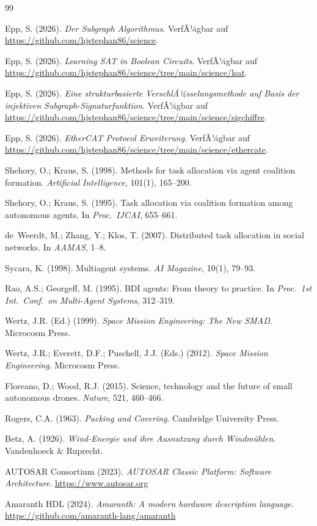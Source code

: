 ﻿\documentclass[a4paper,12pt]{article}
\theoremstyle{definition}
\begin{document}
\begin{thebibliography}{99}

Epp, S. (2026).
\textit{Der Subgraph Algorithmus}. VerfÃ¼gbar auf
\url{https://github.com/hjstephan86/science}.

Epp, S. (2026).
\textit{Learning SAT in Boolean Circuits}. VerfÃ¼gbar auf
\url{https://github.com/hjstephan86/science/tree/main/science/lsat}.

Epp, S. (2026).
\textit{Eine strukturbasierte VerschlÃ¼sselungsmethode auf Basis der injektiven Subgraph-Signaturfunktion}. VerfÃ¼gbar auf
\url{https://github.com/hjstephan86/science/tree/main/science/sigchiffre}.

Epp, S. (2026).
\textit{EtherCAT Protocol Erweiterung}.  VerfÃ¼gbar auf
\url{https://github.com/hjstephan86/science/tree/main/science/ethercate}.

Shehory, O.; Kraus, S. (1998).
Methods for task allocation via agent coalition formation.
\textit{Artificial Intelligence}, 101(1), 165--200.

Shehory, O.; Kraus, S. (1995).
Task allocation via coalition formation among autonomous agents.
In \textit{Proc.\ IJCAI}, 655--661.

de~Weerdt, M.; Zhang, Y.; Klos, T. (2007).
Distributed task allocation in social networks.
In \textit{AAMAS}, 1--8.

Sycara, K. (1998).
Multiagent systems.
\textit{AI Magazine}, 10(1), 79--93.

Rao, A.S.; Georgeff, M. (1995).
BDI agents: From theory to practice.
In \textit{Proc.\ 1st Int.\ Conf.\ on Multi-Agent Systems}, 312--319.

Wertz, J.R. (Ed.) (1999).
\textit{Space Mission Engineering: The New SMAD}.
Microcosm Press.

Wertz, J.R.; Everett, D.F.; Puschell, J.J. (Eds.) (2012).
\textit{Space Mission Engineering}. Microcosm Press.

Floreano, D.; Wood, R.J. (2015).
Science, technology and the future of small autonomous drones.
\textit{Nature}, 521, 460--466.

Rogers, C.A. (1963).
\textit{Packing and Covering}. Cambridge University Press.

Betz, A. (1926).
\textit{Wind-Energie und ihre Ausnutzung durch Windm\"uhlen}.
Vandenhoeck \& Ruprecht.

AUTOSAR Consortium (2023).
\textit{AUTOSAR Classic Platform: Software Architecture}.
\url{https://www.autosar.org}

Amaranth HDL (2024).
\textit{Amaranth: A modern hardware description language}.
\url{https://github.com/amaranth-lang/amaranth}

\end{thebibliography}
\end{document}
